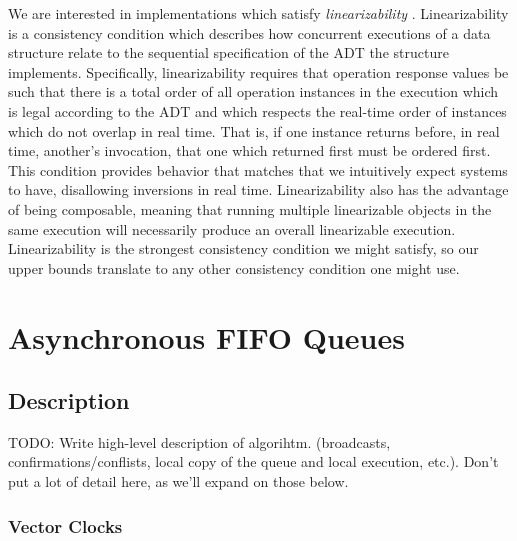 \documentclass[a4paper,anonymous,USenglish]{lipics-v2021} %
\theoremstyle{definition}
\begin{document}
We are interested in implementations which satisfy \emph{linearizability} \cite{HerlihyWing90}.  Linearizability is a consistency condition which describes how concurrent executions of a data structure relate to the sequential specification of the ADT the structure implements.  Specifically, linearizability requires that operation response values be such that there is a total order of all operation instances in the execution which is legal according to the ADT and which respects the real-time order of instances which do not overlap in real time.  That is, if one instance returns before, in real time, another's invocation, that one which returned first must be ordered first.  This condition provides behavior that matches that we intuitively expect systems to have, disallowing inversions in real time.  Linearizability also has the advantage of being composable, meaning that running multiple linearizable objects in the same execution will necessarily produce an overall linearizable execution.  Linearizability is the strongest consistency condition we might satisfy, so our upper bounds translate to any other consistency condition one might use.


\section{Asynchronous FIFO Queues}

\subsection{Description}

TODO: Write high-level description of algorihtm. (broadcasts, confirmations/conflists, local copy of the queue and local execution, etc.).  Don't put a lot of detail here, as we'll expand on those below.

\subsubsection{Vector Clocks}
\end{document}
